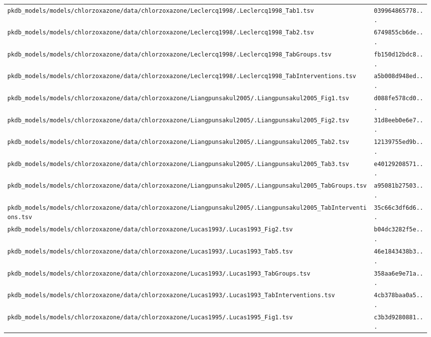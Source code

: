 \documentclass{article}
\begin{document}
\begin{longtable}{ll}
\texttt{pkdb\_models/models/chlorzoxazone/data/chlorzoxazone/Leclercq1998/.Leclercq1998\_Tab1.tsv} & \texttt{039964865778...} \\
\texttt{pkdb\_models/models/chlorzoxazone/data/chlorzoxazone/Leclercq1998/.Leclercq1998\_Tab2.tsv} & \texttt{6749855cb6de...} \\
\texttt{pkdb\_models/models/chlorzoxazone/data/chlorzoxazone/Leclercq1998/.Leclercq1998\_TabGroups.tsv} & \texttt{fb150d12bdc8...} \\
\texttt{pkdb\_models/models/chlorzoxazone/data/chlorzoxazone/Leclercq1998/.Leclercq1998\_TabInterventions.tsv} & \texttt{a5b008d948ed...} \\
\texttt{pkdb\_models/models/chlorzoxazone/data/chlorzoxazone/Liangpunsakul2005/.Liangpunsakul2005\_Fig1.tsv} & \texttt{d088fe578cd0...} \\
\texttt{pkdb\_models/models/chlorzoxazone/data/chlorzoxazone/Liangpunsakul2005/.Liangpunsakul2005\_Fig2.tsv} & \texttt{31d8eeb0e6e7...} \\
\texttt{pkdb\_models/models/chlorzoxazone/data/chlorzoxazone/Liangpunsakul2005/.Liangpunsakul2005\_Tab2.tsv} & \texttt{12139755ed9b...} \\
\texttt{pkdb\_models/models/chlorzoxazone/data/chlorzoxazone/Liangpunsakul2005/.Liangpunsakul2005\_Tab3.tsv} & \texttt{e40129208571...} \\
\texttt{pkdb\_models/models/chlorzoxazone/data/chlorzoxazone/Liangpunsakul2005/.Liangpunsakul2005\_TabGroups.tsv} & \texttt{a95081b27503...} \\
\texttt{pkdb\_models/models/chlorzoxazone/data/chlorzoxazone/Liangpunsakul2005/.Liangpunsakul2005\_TabInterventions.tsv} & \texttt{35c66c3df6d6...} \\
\texttt{pkdb\_models/models/chlorzoxazone/data/chlorzoxazone/Lucas1993/.Lucas1993\_Fig2.tsv} & \texttt{b04dc3282f5e...} \\
\texttt{pkdb\_models/models/chlorzoxazone/data/chlorzoxazone/Lucas1993/.Lucas1993\_Tab5.tsv} & \texttt{46e1843438b3...} \\
\texttt{pkdb\_models/models/chlorzoxazone/data/chlorzoxazone/Lucas1993/.Lucas1993\_TabGroups.tsv} & \texttt{358aa6e9e71a...} \\
\texttt{pkdb\_models/models/chlorzoxazone/data/chlorzoxazone/Lucas1993/.Lucas1993\_TabInterventions.tsv} & \texttt{4cb378baa0a5...} \\
\texttt{pkdb\_models/models/chlorzoxazone/data/chlorzoxazone/Lucas1995/.Lucas1995\_Fig1.tsv} & \texttt{c3b3d9280881...} \\

\end{longtable}
\end{document}

